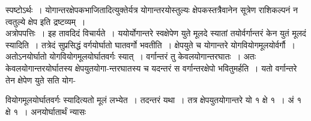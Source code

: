 \documentclass[11pt, openany]{book}
\begin{document}
\begin{sloppypar}
स्पष्टोऽर्थः~। योगान्तरक्षेपकभाजितादित्युक्तेर्यत्र योगान्तरयोस्तुल्यः क्षेपकस्तत्रैवानेन सूत्रेण राशिकल्पनं न त्वतुल्ये क्षेप इति द्रष्टव्यम्~।\\

अत्रोपपत्तिः~। इह तावदिदं विचार्यते~। ययोर्योगान्तरे स्वक्षेपेण युते मूलदे स्यातां तयोर्वर्गान्तरं केन युतं मूलदं स्यादिति~। तत्रेदं सुप्रसिद्धं वर्गयोर्घातो घातवर्गो भवतीति~। क्षेपयुते च योगान्तरे योगवियोगमूलयोर्वर्गौ~। अतोऽनयोर्घातो योगवियोगमूलयोर्घातवर्गः स्यात्~। वर्गान्तरं तु केवलयोगान्तरघातः~। अतः केवलयोगान्तरयोर्घातस्य क्षेपयुतयोगा-न्तरघातस्य च यदन्तरं स वर्गान्तरक्षेपो भवितुमर्हति~। यतो वर्गान्तरे तेन क्षेपेण युते सति योग-
\end{sloppypar}

\newpage

\begin{sloppypar}
\noindent वियोगमूलयोर्घातवर्गः स्यादित्यतो मूलं लभ्येत~। तदन्तरं यथा~। तत्र क्षेपयुतयोगान्तरे यो १ क्षे १~। अं १ क्षे १~। अनयोर्घातार्थं न्यासः 
\end{sloppypar}
\end{document}

